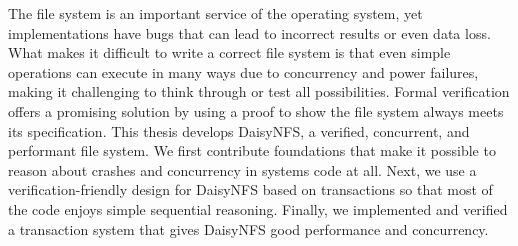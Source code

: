 The file system is an important service of the operating system, yet implementations
have bugs that can lead to incorrect results or even data loss. What makes it
difficult to write a correct file system is that even simple operations can
execute in many ways due to concurrency and power failures, making it
challenging to think through or test all possibilities. Formal verification
offers a promising solution by using a proof to show the file system always
meets its specification. This thesis develops DaisyNFS, a verified, concurrent,
and performant file system. We first contribute foundations that make it possible to
reason about crashes and concurrency in systems code at all. Next, we use a
verification-friendly design for DaisyNFS based on transactions so that most of
the code enjoys simple sequential reasoning. Finally, we implemented and
verified a transaction system that gives DaisyNFS good performance and
concurrency.
